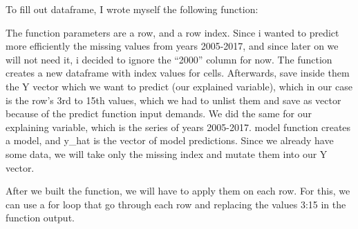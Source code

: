\documentclass[]{article}
\newenvironment{Shaded}{\begin{snugshade}}{\end{snugshade}}
\newcommand{\KeywordTok}[1]{\textcolor[rgb]{0.13,0.29,0.53}{\textbf{#1}}}
\newcommand{\DataTypeTok}[1]{\textcolor[rgb]{0.13,0.29,0.53}{#1}}
\newcommand{\DecValTok}[1]{\textcolor[rgb]{0.00,0.00,0.81}{#1}}
\newcommand{\StringTok}[1]{\textcolor[rgb]{0.31,0.60,0.02}{#1}}
\newcommand{\ControlFlowTok}[1]{\textcolor[rgb]{0.13,0.29,0.53}{\textbf{#1}}}
\newcommand{\OperatorTok}[1]{\textcolor[rgb]{0.81,0.36,0.00}{\textbf{#1}}}
\newcommand{\NormalTok}[1]{#1}
\begin{document}
To fill out dataframe, I wrote myself the following function:

\begin{Shaded}
\end{Shaded}

The function parameters are a row, and a row index. Since i wanted to
predict more efficiently the missing values from years 2005-2017, and
since later on we will not need it, i decided to ignore the ``2000''
column for now. The function creates a new dataframe with index values
for cells. Afterwards, save inside them the Y vector which we want to
predict (our explained variable), which in our case is the row's 3rd to
15th values, which we had to unlist them and save as vector because of
the predict function input demands. We did the same for our explaining
variable, which is the series of years 2005-2017. model function creates
a model, and y\_hat is the vector of model predictions. Since we already
have some data, we will take only the missing index and mutate them into
our Y vector.

After we built the function, we will have to apply them on each row. For
this, we can use a for loop that go through each row and replacing the
values 3:15 in the function output.
\end{document}
